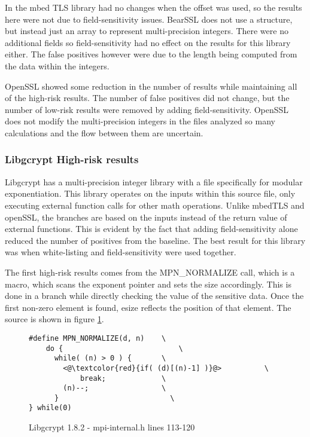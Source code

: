  In the mbed TLS library had no changes when the offset was used, so the results
 here were not due to field-sensitivity issues. BearSSL does not use a structure,
 but instead just an array to represent multi-precision integers. There were no
 additional fields so field-sensitivity had no effect on the results for this
 library either. The false positives however were due to the length being
 computed from the data within the integers.

 OpenSSL showed some reduction in the number of results while maintaining all of
 the high-risk results. The number of false positives did not change, but the
 number of low-risk results were removed by adding field-sensitivity. OpenSSL
 does not modify the multi-precision integers in the files analyzed so many
 calculations and the flow between them are uncertain.

\subsubsection{Libgcrypt High-risk results}


     Libgcrypt has a multi-precision integer library with a file specifically
     for modular exponentiation. This library operates on the inputs within this
     source file, only executing external function calls for other math
     operations. Unlike mbedTLS and openSSL, the branches are based on the
     inputs instead of the return value of external functions. This is evident
     by the fact that adding field-sensitivity alone reduced the number of
     positives from the baseline. The best result for this library was when
     white-listing and field-sensitivity were used together.

     The first high-risk results comes from the MPN\_NORMALIZE call, which is a
     macro, which scans the exponent pointer and sets the size accordingly. This
     is done in a branch while directly checking the value of the sensitive
     data. Once the first non-zero element is found, esize reflects the position
     of that element. The source is shown in figure \ref{code:libgcrypt_normalize}.

\begin{figure}[h!]
\begin{lstlisting}
#define MPN_NORMALIZE(d, n)    \
    do {		                   \
      while( (n) > 0 ) {       \
        <@\textcolor{red}{if( (d)[(n)-1] )}@>          \
            break;	           \
        (n)--;	               \
      }		                     \
} while(0)
\end{lstlisting}
\caption{Libgcrypt 1.8.2 - mpi-internal.h lines 113-120}
\label{code:libgcrypt_normalize}
\end{figure}

